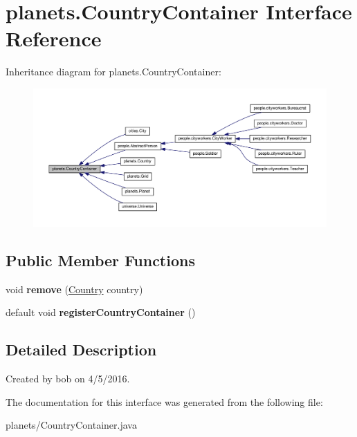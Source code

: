 \hypertarget{interfaceplanets_1_1_country_container}{}\section{planets.\+Country\+Container Interface Reference}
\label{interfaceplanets_1_1_country_container}


Inheritance diagram for planets.\+Country\+Container\+:\nopagebreak
\begin{figure}[H]
\begin{center}
\leavevmode
\includegraphics[width=350pt]{interfaceplanets_1_1_country_container__inherit__graph}
\end{center}
\end{figure}
\subsection*{Public Member Functions}
\begin{DoxyCompactItemize}
\item 
void {\bfseries remove} (\hyperlink{classplanets_1_1_country}{Country} country)\hypertarget{interfaceplanets_1_1_country_container_a9cd73022dc77f4f0e9075bc51e575b3f}{}\label{interfaceplanets_1_1_country_container_a9cd73022dc77f4f0e9075bc51e575b3f}

\item 
default void {\bfseries register\+Country\+Container} ()\hypertarget{interfaceplanets_1_1_country_container_a352913d647b887db7db9ad6fa84d7f4f}{}\label{interfaceplanets_1_1_country_container_a352913d647b887db7db9ad6fa84d7f4f}

\end{DoxyCompactItemize}


\subsection{Detailed Description}
Created by bob on 4/5/2016. 

The documentation for this interface was generated from the following file\+:\begin{DoxyCompactItemize}
\item 
planets/Country\+Container.\+java\end{DoxyCompactItemize}
